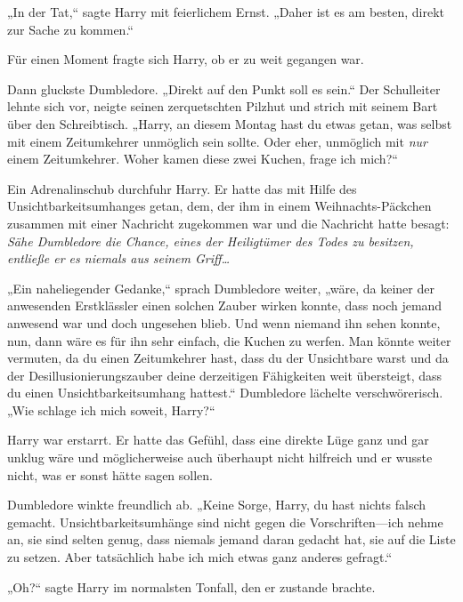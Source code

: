 {„In der Tat,“ sagte Harry mit feierlichem Ernst. „Daher ist es am besten, direkt zur Sache zu kommen.“

Für einen Moment fragte sich Harry, ob er zu weit gegangen war.

Dann gluckste Dumbledore. „Direkt auf den Punkt soll es sein.“ Der Schulleiter lehnte sich vor, neigte seinen zerquetschten Pilzhut und strich mit seinem Bart über den Schreibtisch. „Harry, an diesem Montag hast du etwas getan, was selbst mit einem Zeitumkehrer unmöglich sein sollte. Oder eher, unmöglich mit \emph{nur} einem Zeitumkehrer. Woher kamen diese zwei Kuchen, frage ich mich?“

Ein Adrenalinschub durchfuhr Harry. Er hatte das mit Hilfe des Unsichtbarkeitsumhanges getan, dem, der ihm in einem Weihnachts-Päckchen zusammen mit einer Nachricht zugekommen war und die Nachricht hatte besagt: \emph{Sähe Dumbledore die Chance, eines der Heiligtümer des Todes zu besitzen, entließe er es niemals aus seinem Griff…}

„Ein naheliegender Gedanke,“ sprach Dumbledore weiter, „wäre, da keiner der anwesenden Erstklässler einen solchen Zauber wirken konnte, dass noch jemand anwesend war und doch ungesehen blieb. Und wenn niemand ihn sehen konnte, nun, dann wäre es für ihn sehr einfach, die Kuchen zu werfen. Man könnte weiter vermuten, da du einen Zeitumkehrer hast, dass du der Unsichtbare warst und da der Desillusionierungszauber deine derzeitigen Fähigkeiten weit übersteigt, dass du einen Unsichtbarkeitsumhang hattest.“ Dumbledore lächelte verschwörerisch. „Wie schlage ich mich soweit, Harry?“

Harry war erstarrt. Er hatte das Gefühl, dass eine direkte Lüge ganz und gar unklug wäre und möglicherweise auch überhaupt nicht hilfreich und er wusste nicht, was er sonst hätte sagen sollen.

Dumbledore winkte freundlich ab. „Keine Sorge, Harry, du hast nichts falsch gemacht. Unsichtbarkeitsumhänge sind nicht gegen die Vorschriften—ich nehme an, sie sind selten genug, dass niemals jemand daran gedacht hat, sie auf die Liste zu setzen. Aber tatsächlich habe ich mich etwas ganz anderes gefragt.“

„Oh?“ sagte Harry im normalsten Tonfall, den er zustande brachte.

}
